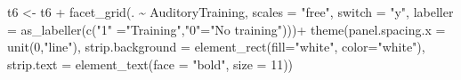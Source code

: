 \documentclass[a4paper, twoside]{templates/ociamthesis}
\newenvironment{Shaded}{\begin{snugshade}}{\end{snugshade}}
\newcommand{\AttributeTok}[1]{\textcolor[rgb]{0.77,0.63,0.00}{#1}}
\newcommand{\DecValTok}[1]{\textcolor[rgb]{0.00,0.00,0.81}{#1}}
\newcommand{\FunctionTok}[1]{\textcolor[rgb]{0.00,0.00,0.00}{#1}}
\newcommand{\NormalTok}[1]{#1}
\newcommand{\OtherTok}[1]{\textcolor[rgb]{0.56,0.35,0.01}{#1}}
\newcommand{\SpecialCharTok}[1]{\textcolor[rgb]{0.00,0.00,0.00}{#1}}
\newcommand{\StringTok}[1]{\textcolor[rgb]{0.31,0.60,0.02}{#1}}
\renewenvironment{Shaded}
{
  \vspace{4pt}%
  \begin{snugshade}%
}{%
  \end{snugshade}%
  \vspace{4pt}%
}
\begin{document}
\begin{Shaded}
\begin{Highlighting}[]
\NormalTok{t6 }\OtherTok{\textless{}{-}}\NormalTok{ t6 }\SpecialCharTok{+} \FunctionTok{facet\_grid}\NormalTok{(. }\SpecialCharTok{\textasciitilde{}}\NormalTok{ AuditoryTraining, }\AttributeTok{scales =} \StringTok{"free"}\NormalTok{, }\AttributeTok{switch =} \StringTok{"y"}\NormalTok{,}
  \AttributeTok{labeller =} \FunctionTok{as\_labeller}\NormalTok{(}\FunctionTok{c}\NormalTok{(}\StringTok{"1"} \OtherTok{=}\StringTok{"Training"}\NormalTok{,}\StringTok{"0"}\OtherTok{=}\StringTok{"No training"}\NormalTok{)))}\SpecialCharTok{+}
  \FunctionTok{theme}\NormalTok{(}\AttributeTok{panel.spacing.x =} \FunctionTok{unit}\NormalTok{(}\DecValTok{0}\NormalTok{,}\StringTok{"line"}\NormalTok{),}
        \AttributeTok{strip.background =} \FunctionTok{element\_rect}\NormalTok{(}\AttributeTok{fill=}\StringTok{"white"}\NormalTok{, }\AttributeTok{color=}\StringTok{"white"}\NormalTok{),}
        \AttributeTok{strip.text =} \FunctionTok{element\_text}\NormalTok{(}\AttributeTok{face =} \StringTok{"bold"}\NormalTok{, }\AttributeTok{size =} \DecValTok{11}\NormalTok{))}


\end{Highlighting}
\end{Shaded}
\end{document}
